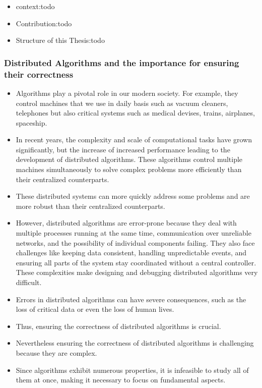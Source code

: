 
\begin{itemize}
    \item context:todo
    \item Contribution:todo
    \item Structure of this Thesis:todo
\end{itemize}


\subsubsection*{Distributed Algorithms and the importance for ensuring their correctness}

\begin{itemize}
    \item Algorithms play a pivotal role in our modern society. For example, they control machines that we use in daily basis such as vacuum cleaners, telephones but also critical systems such as medical devises, trains, airplanes, spaceship.
    
    \item In recent years, the complexity and scale of computational tasks have grown significantly, but the increase of  increased performance  leading to the development of distributed algorithms. These algorithms control multiple machines simultaneously to solve complex problems more efficiently than their centralized counterparts.

    \item These distributed systems can more quickly address some problems and are more robust than their centralized counterparts.  
  
    \item However, distributed algorithms are error-prone because they deal with multiple processes running at the same time, communication over unreliable networks, and the possibility of individual components failing. They also face challenges like keeping data consistent, handling unpredictable events, and ensuring all parts of the system stay coordinated without a central controller. These complexities make designing and debugging distributed algorithms very difficult.
    \item Errors in distributed algorithms can have severe consequences, such as the loss of critical data or even the loss of human lives.
    \item Thus, ensuring the correctness of distributed algorithms is crucial. 
    \item Nevertheless ensuring the correctness of distributed algorithms is challenging because they are complex. 
    \item Since algorithms exhibit numerous properties, it is infeasible to study all of them at once, making it necessary to focus on fundamental aspects.
\end{itemize}

